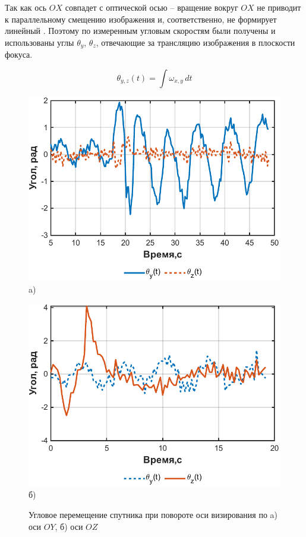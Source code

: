 Так как ось $OX$ совпадет с оптической осью -- вращение вокруг $OX$ не приводит к параллельному смещению изображения и, соответственно, не формирует линейный \blur{}. Поэтому по измеренным угловым скоростям были получены и использованы углы $\theta_y$, $\theta_z$, отвечающие за трансляцию изображения в плоскости фокуса.

\begin{equation}
	\label{eq:thetaZY}
	\theta_{y,z}(t)= \int \omega_{x,y}\, dt
\end{equation}

\begin{figure}[!h]
	\begin{minipage}[b][][b]{0.49\linewidth}\centering
		\includegraphics[width=1\linewidth]{matlab/img/thetaY.pdf} \\ a)
	\end{minipage}
	\hfill
	\begin{minipage}[b][][b]{0.49\linewidth}\centering
		\includegraphics[width=1\linewidth]{matlab/img/thetaZ.pdf} \\ б)
	\end{minipage}
	\caption{Угловое перемещение спутника при повороте оси визирования по a) оси $OY$, б) оси $OZ$ }
	\label{fig:theta}
\end{figure}

